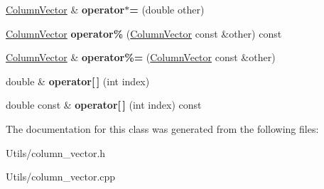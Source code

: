 \begin{DoxyCompactItemize}
\hyperlink{classColumnVector}{Column\+Vector} \& {\bfseries operator$\ast$=} (double other)
\item 
\mbox{\label{classColumnVector_a509eb2c7108dd1870f7282a3eb9038c1}} 
\hyperlink{classColumnVector}{Column\+Vector} {\bfseries operator\%} (\hyperlink{classColumnVector}{Column\+Vector} const \&other) const
\item 
\mbox{\label{classColumnVector_afe72f924a5a097ad3386576c6fe950bf}} 
\hyperlink{classColumnVector}{Column\+Vector} \& {\bfseries operator\%=} (\hyperlink{classColumnVector}{Column\+Vector} const \&other)
\item 
\mbox{\label{classColumnVector_a27f20757b2d702147f5b70a966e17b6c}} 
double \& {\bfseries operator\mbox{[}$\,$\mbox{]}} (int index)
\item 
\mbox{\label{classColumnVector_a205d763788746d98810ec1d7541fc20f}} 
double const  \& {\bfseries operator\mbox{[}$\,$\mbox{]}} (int index) const
\end{DoxyCompactItemize}


The documentation for this class was generated from the following files\+:\begin{DoxyCompactItemize}
\item 
Utils/column\+\_\+vector.\+h\item 
Utils/column\+\_\+vector.\+cpp\end{DoxyCompactItemize}
